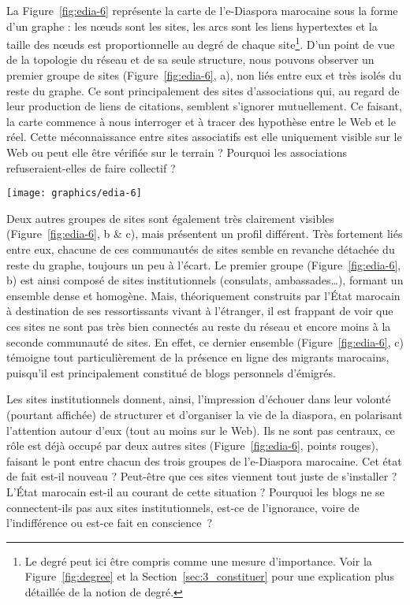 \documentclass[symmetric,justified,marginals=raggedouter]{tufte-book}
\begin{document}
\noindent La Figure~\ref{fig:edia-6} représente la carte de l'e-Diaspora marocaine sous la forme d'un graphe : les nœuds sont les sites, les arcs sont les liens hypertextes et la taille des nœuds est proportionnelle au degré de chaque site\footnote{\RaggedOuter Le degré peut ici être compris comme une mesure d'importance. Voir la Figure~\ref{fig:degree} et la Section~\ref{sec:3_constituer} pour une explication plus détaillée de la notion de degré.}. D'un point de vue de la topologie du réseau et de sa seule structure, nous pouvons observer un premier groupe de sites (Figure~\ref{fig:edia-6}, a), non liés entre eux et très isolés du reste du graphe. Ce sont principalement des sites d'associations qui, au regard de leur production de liens de citations, semblent s'ignorer mutuellement. Ce faisant, la carte commence à nous interroger et à tracer des hypothèse entre le Web et le réel. Cette méconnaissance entre sites associatifs est elle uniquement visible sur le Web ou peut elle être vérifiée sur le terrain ? Pourquoi les associations refuseraient-elles de faire collectif ? 

\begin{figure*}
  \texttt{[image: graphics/edia-6]}
  \caption{Cartographie de l'e-Diaspora marocaine (Par D. Diminescu \& M. Renault)}
  \label{fig:edia-6}
\end{figure*} 

\noindent Deux autres groupes de sites sont également très clairement visibles (Figure~\ref{fig:edia-6}, b \& c), mais présentent un profil différent. Très fortement liés entre eux, chacune de ces communautés de sites semble en revanche détachée du reste du graphe, toujours un peu à l'écart. Le premier groupe (Figure~\ref{fig:edia-6}, b) est ainsi composé de sites institutionnels (consulats, ambassades\ldots{}), formant un ensemble dense et homogène. Mais, théoriquement construits par l'État marocain à destination de ses ressortissants vivant à l'étranger, il est frappant de voir que ces sites ne sont pas très bien connectés au reste du réseau et encore moins à la seconde communauté de sites. En effet, ce dernier ensemble (Figure~\ref{fig:edia-6}, c) témoigne tout particulièrement de la présence en ligne des migrants marocains, puisqu'il est principalement constitué de blogs personnels d'émigrés. 

Les sites institutionnels donnent, ainsi, l'impression d'échouer dans leur volonté (pourtant affichée) de structurer et d'organiser la vie de la diaspora, en polarisant l'attention autour d'eux (tout au moins sur le Web). Ils ne sont pas centraux, ce rôle est déjà occupé par deux autres sites (Figure~\ref{fig:edia-6}, points rouges), faisant le pont entre chacun des trois groupes de l'e-Diaspora marocaine. Cet état de fait est-il nouveau ? Peut-être que ces sites viennent tout juste de s'installer ? L'État marocain est-il au courant de cette situation ? Pourquoi les blogs ne se connectent-ils pas aux sites institutionnels, est-ce de l'ignorance, voire de l'indifférence ou est-ce fait en conscience~?    
\end{document}
